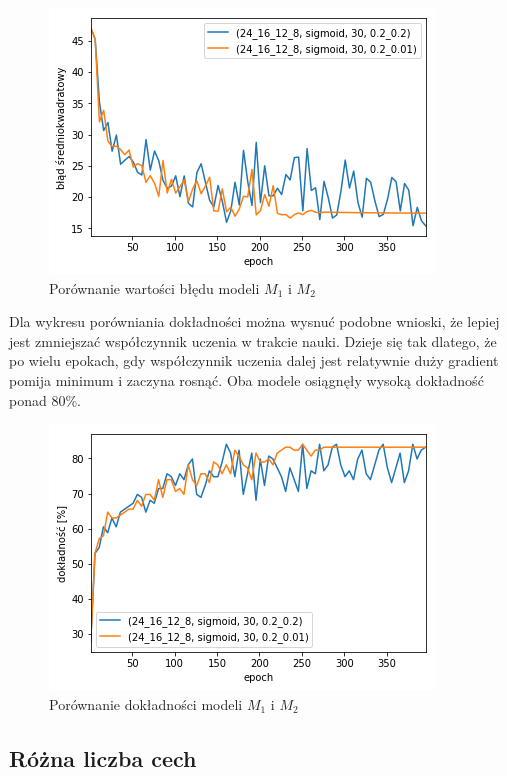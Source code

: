     \begin{figure}[htp]
        \centering
        \includegraphics[scale=0.8]{./img/lr-error.png}
        \caption{Porównanie wartości błędu modeli $M_1$ i $M_2$}
    \end{figure}

    Dla wykresu porówniania dokładności można wysnuć podobne wnioski, że lepiej jest zmniejszać współczynnik uczenia w trakcie nauki.
    Dzieje się tak dlatego, że po wielu epokach, gdy współczynnik uczenia dalej jest relatywnie duży gradient pomija minimum i zaczyna rosnąć.
    Oba modele osiągnęły wysoką dokładność ponad 80\%.

    \begin{figure}[htp]
        \centering
        \includegraphics[scale=0.8]{./img/lr-accuracy.png}
        \caption{Porównanie dokładności modeli $M_1$ i $M_2$}
    \end{figure}

    \subsection{Różna liczba cech}\label{subsec:różnaLiczbaCech}

